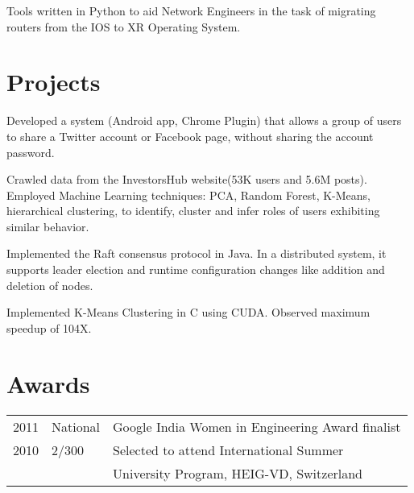\documentclass[]{deedy-resume-openfont}
\begin{document}
\begin{minipage}[t]{0.63\textwidth}
Tools written in Python to aid Network Engineers in the task of migrating routers from the IOS to XR Operating System.
\sectionsep


\section{Projects}
Developed a system (Android app, Chrome Plugin) that
allows
a
group
of
users
to
share
a
Twitter
account
or
Facebook
page,
without
sharing
the
account
password.
\sectionsep

 Crawled
data
from
the
InvestorsHub
website(53K users and 5.6M posts).
Employed
Machine
Learning
techniques:
PCA,
Random
Forest,
K-Means,
hierarchical
clustering,
to
identify,
cluster
and
infer
roles
of
users
exhibiting
similar
behavior.

\sectionsep

Implemented the Raft consensus protocol in Java. In a distributed system, it supports leader election and runtime configuration changes like addition and deletion of nodes.
\sectionsep

Implemented K-Means Clustering in C using CUDA. Observed maximum speedup of 104X.

\section{Awards} 
\begin{tabular}{rll}
2011	     & National  & Google
India
Women
in
Engineering
Award finalist\\
2010 & 2/300 & Selected to attend International Summer\\  & & University Program, HEIG-VD, Switzerland\\
\end{tabular}

\end{minipage} 
\end{document}

